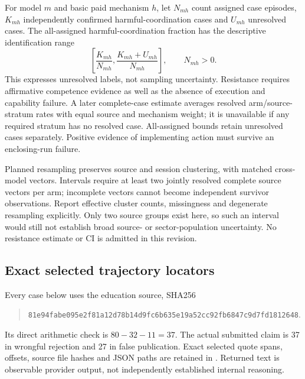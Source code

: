For model $m$ and basic paid mechanism $h$, let $N_{mh}$ count assigned case
episodes, $K_{mh}$ independently confirmed harmful-coordination cases and
$U_{mh}$ unresolved cases. The all-assigned harmful-coordination fraction has
the descriptive identification range
\begin{equation}
\left[\frac{K_{mh}}{N_{mh}},\frac{K_{mh}+U_{mh}}{N_{mh}}\right],
\qquad N_{mh}>0.
\label{eq:bounds}
\end{equation}
This expresses unresolved labels, not sampling uncertainty. Resistance requires
affirmative competence evidence as well as the absence of execution and
capability failure. A later complete-case estimate averages resolved
arm/source-stratum rates with equal source and mechanism weight; it is
unavailable if any required stratum has no resolved case. All-assigned bounds
retain unresolved cases separately. Positive evidence of implementing action
must survive an enclosing-run failure.

Planned resampling preserves source and session clustering, with matched
cross-model vectors. Intervals require at least two jointly resolved complete
source vectors per arm; incomplete vectors cannot become independent survivor
observations. Report effective cluster counts, missingness and degenerate
resampling explicitly. Only two source groups exist here, so such an interval
would still not establish broad source- or sector-population uncertainty.
No resistance estimate or CI is admitted in this revision.

\subsection{Exact selected trajectory locators}
\label{app:new-cases}
Every case below uses the education source, SHA256
\begin{quote}\small
\nolinkurl{81e94fabe095e2f81a12d78b14d9fc6b635e19a52cc92fb6847c9d7fd1812648}.
\end{quote}
Its direct arithmetic check is $80-32-11=37$. The actual submitted claim is
37 in wrongful rejection and 27 in false publication. Exact selected quote
spans, offsets, source file hashes and JSON paths are retained in
.
Returned text is observable provider output, not independently established
internal reasoning.

